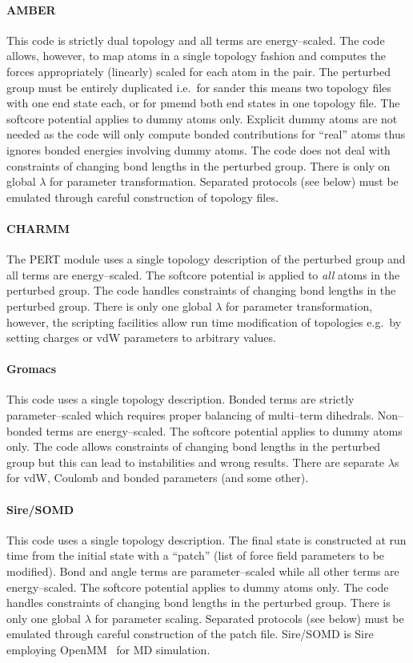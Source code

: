 \documentclass[journal=jctcce,manuscript=article]{achemso}
\begin{document}
\paragraph{AMBER} This code is strictly dual topology and all terms
are energy--scaled.  The code allows, however, to map atoms in a
single topology fashion and computes the forces appropriately
(linearly) scaled for each atom in the pair.  The perturbed group must
be entirely duplicated i.e.\ for sander this means two topology files
with one end state each, or for pmemd both end states in one topology
file.  The softcore potential applies to dummy atoms only.  Explicit
dummy atoms are not needed as the code will only compute bonded
contributions for ``real'' atoms thus ignores bonded energies
involving dummy atoms.  The code does not deal with constraints of
changing bond lengths in the perturbed group.  There is only on global
$\lambda$ for parameter transformation.  Separated protocols (see
below) must be emulated through careful construction of topology
files.

\paragraph{CHARMM} The PERT module uses a single topology description
of the perturbed group and all terms are energy--scaled.  The softcore
potential is applied to \emph{all} atoms in the perturbed group.  The
code handles constraints of changing bond lengths in the perturbed
group.  There is only one global $\lambda$ for parameter
transformation, however, the scripting facilities allow run time
modification of topologies e.g.\ by setting charges or vdW parameters
to arbitrary values.

\paragraph{Gromacs} This code uses a single topology description.
Bonded terms are strictly parameter--scaled which requires proper
balancing of multi--term dihedrals.  Non--bonded terms are
energy--scaled.  The softcore potential applies to dummy atoms only.
The code allows constraints of changing bond lengths in the perturbed
group but this can lead to instabilities and wrong results.  There are
separate $\lambda$s for vdW, Coulomb and bonded parameters (and some
other).

\paragraph{Sire/SOMD} This code uses a single topology description.
The final state is constructed at run time from the initial state with
a ``patch'' (list of force field parameters to be modified).  Bond and
angle terms are parameter--scaled while all other terms are
energy--scaled.  The softcore potential applies to dummy atoms only.
The code handles constraints of changing bond lengths in the perturbed
group.  There is only one global $\lambda$ for parameter scaling.
Separated protocols (see below) must be emulated through careful
construction of the patch file.  Sire/SOMD is Sire~\cite{Sire-2016}
employing OpenMM~\cite{doi:10.1021/ct300857j} for MD simulation.
\end{document}
